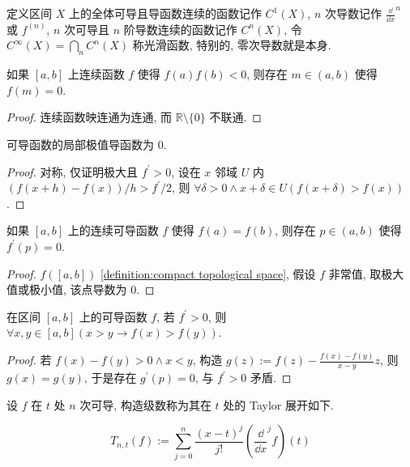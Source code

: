 \begin{definition}
    定义区间 \(X\) 上的全体可导且导函数连续的函数记作 \(C^1 (X)\), \(n\) 次导数记作 \(\frac{\dd}{\dd x}^n\) 或 \(f^{(n)}\), \(n\) 次可导且 \(n\) 阶导数连续的函数记作 \(C^n (X)\),
    令 \(C^\infty (X) = \bigcap_n C^n (X)\) 称光滑函数, 特别的, 零次导数就是本身.
\end{definition}

\begin{theorem}[中值定理]
    如果 \([a,b]\) 上连续函数 \(f\) 使得 \(f(a)f(b) < 0\), 则存在 \(m \in (a,b)\) 使得 \(f(m) = 0\).

    \begin{proof}
        连续函数映连通为连通, 而 \(\mathbb{R} \setminus \{0\}\) 不联通.
    \end{proof}
\end{theorem}

\begin{corollary}
    可导函数的局部极值导函数为 \(0\).

    \begin{proof}
        对称, 仅证明极大且 \(f^\prime > 0\), 设在 \(x\) 邻域 \(U\) 内 \((f(x+h) - f(x))/h > f^\prime/2\), 则 \(\forall \delta > 0 \land x + \delta \in U(f(x + \delta) > f(x))\).
    \end{proof}
\end{corollary}

\begin{theorem}[中值定理]
    如果 \([a,b]\) 上的连续可导函数 \(f\) 使得 \(f(a) = f(b)\), 则存在 \(p \in (a,b)\) 使得 \(f^\prime (p) = 0\).

    \begin{proof}
        \(f([a,b])\) \ref{definition:compact topological space}, 假设 \(f\) 非常值, 取极大值或极小值, 该点导数为 \(0\).
    \end{proof}
\end{theorem}

\begin{lemma}
    在区间 \([a,b]\) 上的可导函数 \(f\), 若 \(f^\prime > 0\), 则 \(\forall x,y \in [a,b] (x > y \rightarrow f(x) > f(y))\).

    \begin{proof}
        若 \(f(x) - f(y) > 0 \land x < y\), 构造 \(g(z) := f(z) - \frac{f(x) - f(y)}{x-y} z\), 则 \(g(x) = g(y)\),
        于是存在 \(g^\prime (p) = 0\), 与 \(f^\prime > 0\) 矛盾.
    \end{proof}
\end{lemma}

\begin{theorem}[Taylor 级数]
    设 \(f\) 在 \(t\) 处 \(n\) 次可导, 构造级数称为其在 \(t\) 处的 Taylor 展开如下.

    \[
        T_{n,t} (f) := \sum_{j=0}^{n} \frac{{(x - t)}^j}{j!} (\frac{\dd}{\dd x}^j f) (t)
    \]
\end{theorem}

